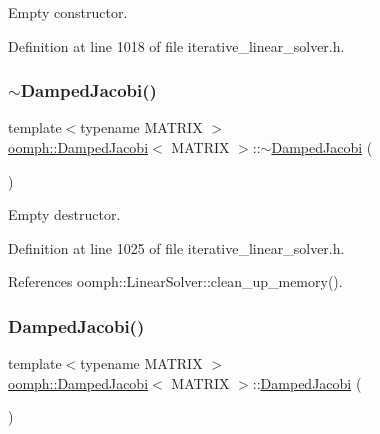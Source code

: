 Empty constructor. 



Definition at line 1018 of file iterative\+\_\+linear\+\_\+solver.\+h.

\mbox{\label{classoomph_1_1DampedJacobi_a0ff17366e055670b3857d4443facf4a6}} 
\subsubsection{\texorpdfstring{$\sim$\+Damped\+Jacobi()}{~DampedJacobi()}}
{\footnotesize\ttfamily template$<$typename M\+A\+T\+R\+IX $>$ \\
\hyperlink{classoomph_1_1DampedJacobi}{oomph\+::\+Damped\+Jacobi}$<$ M\+A\+T\+R\+IX $>$\+::$\sim$\hyperlink{classoomph_1_1DampedJacobi}{Damped\+Jacobi} (\begin{DoxyParamCaption}{ }\end{DoxyParamCaption})\hspace{0.3cm}{\ttfamily [inline]}}



Empty destructor. 



Definition at line 1025 of file iterative\+\_\+linear\+\_\+solver.\+h.



References oomph\+::\+Linear\+Solver\+::clean\+\_\+up\+\_\+memory().

\mbox{\label{classoomph_1_1DampedJacobi_a8773d3bf8e32c1f6caec5b52abb2b21b}} 
\subsubsection{\texorpdfstring{Damped\+Jacobi()}{DampedJacobi()}\hspace{0.1cm}{\footnotesize\ttfamily [2/2]}}
{\footnotesize\ttfamily template$<$typename M\+A\+T\+R\+IX $>$ \\
\hyperlink{classoomph_1_1DampedJacobi}{oomph\+::\+Damped\+Jacobi}$<$ M\+A\+T\+R\+IX $>$\+::\hyperlink{classoomph_1_1DampedJacobi}{Damped\+Jacobi} (\begin{DoxyParamCaption}\item[{const \hyperlink{classoomph_1_1DampedJacobi}{Damped\+Jacobi}$<$ M\+A\+T\+R\+IX $>$ \&}]{ }\end{DoxyParamCaption})\hspace{0.3cm}{\ttfamily [inline]}}



